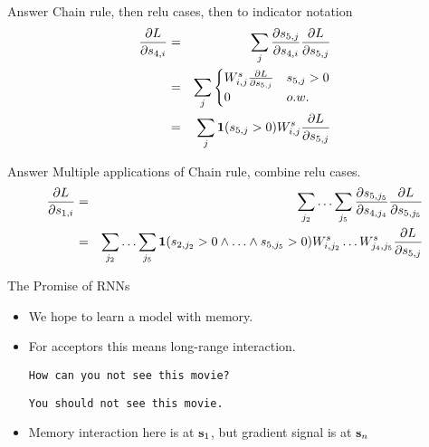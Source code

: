 \documentclass{beamer}
\begin{document}
\begin{frame}{Answer}
  Chain rule, then relu cases, then to indicator notation
  \begin{eqnarray*}
    \frac{\partial L}{\partial s_{4,i} } &=& \sum_{j} \frac{\partial s_{5,j}}{\partial s_{4,i}} \frac{\partial L}{\partial s_{5,j}} \\
     &=&  \sum_{j}
      \begin{cases}
        W^s_{i,j}  \frac{\partial L}{\partial s_{5, j}} &  s_{5, j} > 0\\
        0 &  o.w.\\
      \end{cases} \\
    &=& \sum_{j} \mathbf{1}(s_{5, j} > 0) W^s_{i,j}  \frac{\partial L}{\partial s_{5, j}} 
  \end{eqnarray*}
\end{frame}


\begin{frame}{Answer}
  Multiple applications of Chain rule, combine relu cases.
  \begin{eqnarray*}
    \frac{\partial L}{\partial s_{1,i}} &=& \sum_{j_2} \ldots \sum_{j_5} \frac{\partial s_{5,j_5}}{\partial s_{4,j_4}} \frac{\partial L}{\partial s_{5,j_5}}\\
    &=& \sum_{j_2} \ldots \sum_{j_5} \mathbf{1}(s_{2, j_2} > 0\land \ldots  \land s_{5, j_5} > 0) W^s_{i,j_2} \ldots W^s_{j_4,j_5}  \frac{\partial L}{\partial s_{5, j}}  \\ 
  \end{eqnarray*}
\end{frame}

\begin{frame}{The Promise of RNNs}
  \begin{itemize}
  \item We hope to learn a model with memory.
    \air 
  \item For acceptors this means long-range interaction.

  \air 
  \texttt{How can you not see this movie?}
  \air 

  \texttt{You should not see this movie.}

\item Memory interaction here is at  $\mathbf{s}_1$, but gradient signal is at $\mathbf{s}_n$   
  \end{itemize}
\end{frame}
\end{document}
